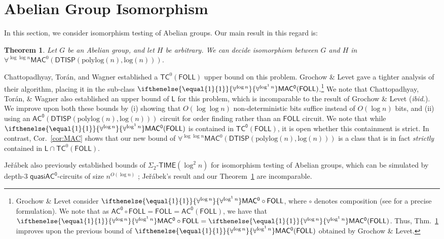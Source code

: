 \documentclass{article}
\newtheorem{theorem}{Theorem}\newtheorem{lemma}[theorem]{Lemma}\newtheorem{proposition}[theorem]{Proposition}\newtheorem{corollary}[theorem]{Corollary}\newtheorem{definition}[theorem]{Definition}\newtheorem{claim}[theorem]{Claim}\newtheorem{remark}[theorem]{Remark}\newtheorem{observation}[theorem]{Observation}\newtheorem{conjecture}[theorem]{Conjecture}\newtheorem{example}[theorem]{Example}
\newcommand{\alphacc}[1]{\ifthenelse{\equal{#1}{1}}{\forall^{\log n}}{\forall^{\log^{#1}n}}} %
\newcommand{\Cor}[1]{Cor.~\ref{#1}\xspace}
\newcommand{\Thm}[1]{Thm.~\ref{#1}\xspace}
\newcommand*{\ComplexityClass}[1]{\ensuremath{\mathsf{#1}}\xspace}
\newcommand{\DTISP}{\ComplexityClass{DTISP}}
\newcommand{\DTISPpll}{\ensuremath{\DTISP(\mathrm{polylog}(n),\mathrm{log}(n))}\xspace}
\newcommand*{\LogSpace}{\ComplexityClass{L}}
\newcommand{\MACz}{\ComplexityClass{MAC^0}}
\newcommand{\ACz}{\ComplexityClass{AC^0}}
\newcommand{\TCz}{\ComplexityClass{TC^0}}
\newcommand{\qACz}{\ComplexityClass{quasiAC^0}}
\newcommand{\FOLL}{\ComplexityClass{FOLL}}
\begin{document}
\section{Abelian Group Isomorphism}
In this section, we consider isomorphism testing of Abelian groups. Our main result in this regard is:

\begin{theorem} \label{thm:abelian}
Let $G$ be an Abelian group, and let $H$ be arbitrary. We can decide isomorphism between $G$ and $H$ in $\forall^{\log \log n} \mathsf{MAC}^0(\DTISPpll)$.
\end{theorem}

Chattopadhyay, Torán, and Wagner \cite{ChattopadhyayToranWagner} established a $\mathsf{TC}^{0}(\FOLL)$ upper bound on this problem. Grochow \& Levet \cite[Theorem 5]{GrochowLevetWL} gave a tighter analysis of their algorithm, placing it in the sub-class $\alphacc{1}\MACz(\FOLL)$.\footnote{Grochow \& Levet consider $\alphacc{1}\MACz \circ \FOLL$, where $\circ$ denotes composition (see \cite{GrochowLevetWL} for a precise formulation). We note that as $\ACz \circ \FOLL = \FOLL = \ACz(\FOLL)$, we have that $\alphacc{1}\MACz \circ \FOLL = \alphacc{1}\MACz(\FOLL)$. Thus, \Thm{thm:abelian} improves upon the previous bound of $\alphacc{1}\MACz(\FOLL)$ obtained by Grochow \& Levet.} 
We note that Chattopadhyay, Tor\'an, \& Wagner also established an upper bound of $\LogSpace$ for this problem, which is incomparable to the result of Grochow \& Levet (\emph{ibid.}). We improve  upon both these bounds by (i) showing that $O(\log \log n)$ non-deterministic bits suffice instead of $O(\log n)$ bits, and (ii) using an $\ACz(\DTISPpll)$ circuit for order finding rather than an $\FOLL$ circuit. We note that while $\alphacc{1}\MACz(\FOLL)$ is contained in $\TCz(\FOLL)$, it is open whether this containment is strict. In contrast, \Cor{cor:MAC} shows that our new bound of $\forall^{\log \log n} \mathsf{MAC}^0(\DTISPpll)$ is a class that is in fact \textit{strictly} contained in $\LogSpace \cap \mathsf{TC}^{0}(\FOLL)$.

Jeřábek also previously established bounds of $\Sigma_{2}$-$\mathsf{TIME}(\log^{2} n)$ for isomorphism testing of Abelian groups, which can be simulated by depth-$3$ $\qACz$-circuits of size $n^{O(\log n)}$ \cite{JerabekTCSStackExchange}; Jeřábek's result and our Theorem~\ref{thm:abelian} are incomparable.
\end{document}
